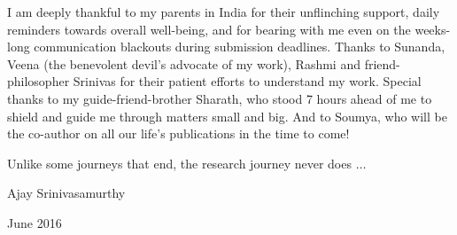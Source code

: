I am deeply thankful to my parents in India for their unflinching support, daily reminders towards overall well-being, and for bearing with me even on the weeks-long communication blackouts during submission deadlines. Thanks to Sunanda, Veena (the benevolent devil's advocate of my work), Rashmi and friend-philosopher Srinivas for their patient efforts to understand my work. Special thanks to my guide-friend-brother Sharath, who stood 7 hours ahead of me to shield and guide me through matters small and big. And to Soumya, who will be the co-author on all our life's publications in the time to come!\par
\vspace{1em}\par
\noindent Unlike some journeys that end, the research journey never does $\ldots$ \par
\par \par
\noindent Ajay Srinivasamurthy\par
{} June 2016

